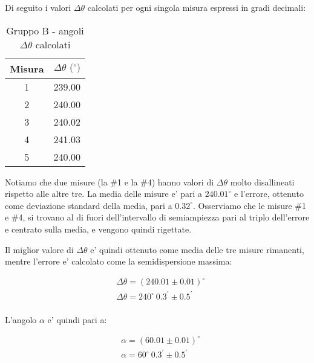 Di seguito i valori $\Delta \theta$ calcolati per ogni singola misura espressi in gradi decimali:
\begin{table}[!htbp]
    {\par\centering
    \begin{tabular}{cc}
        \hline
        Misura & $\Delta \theta \text{ ($^{\circ}$)}$ \\
        \hline
        1   &   239.00 \\
        2   &   240.00 \\
        3   &   240.02 \\
        4   &   241.03 \\
        5   &   240.00 \\
        \hline
    \end{tabular}
    \par}
    \caption{Gruppo B - angoli $\Delta \theta$ calcolati}
\end{table}

Notiamo che due misure (la \#1 e la \#4) hanno valori di $\Delta \theta$ molto disallineati rispetto alle altre tre.
La media delle misure e' pari a $240.01^{\circ}$ e l'errore, ottenuto come deviazione standard della media, pari a $0.32^{\circ}$.
Osserviamo che le misure \#1 e \#4, si trovano al di fuori dell'intervallo di semiampiezza pari al triplo dell'errore e centrato sulla media, e vengono quindi rigettate.

Il miglior valore di $\Delta \theta$ e' quindi ottenuto come media delle tre misure rimanenti, mentre l'errore e' calcolato come la semidispersione massima:

    \begin{align*}
        &\Delta \theta = (240.01 \pm 0.01)^{\circ} \\
        &\Delta \theta = 240^{\circ}\ 0.3^{\prime} \pm 0.5^{\prime} \\
    \end{align*}


L'angolo $\alpha$ e' quindi pari a:

    \begin{align*}
        &\alpha = (60.01 \pm 0.01)^{\circ} \\
        &\alpha = 60^{\circ} \ 0.3^{\prime} \pm 0.5^{\prime}
    \end{align*}


